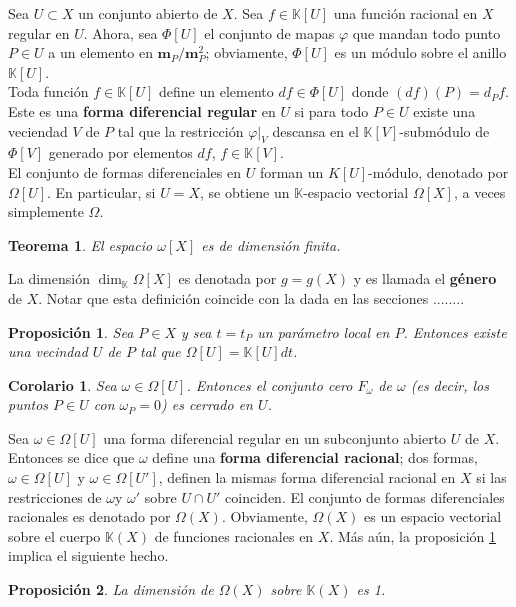 \documentclass[12pt,a4paper]{report}
\newcommand{\msp}{\mathbf{m}_{P}}
\newcommand{\K}{\mathbb{K}}
\newtheorem{teo}{Teorema}[chapter]
\newtheorem{cor}{Corolario}[chapter]
\newtheorem{prop}{Proposición}[chapter]
\begin{document}
Sea $U \subset X$ un conjunto abierto de $X$. Sea $f\in \K [U]$ una función racional en $X$ regular en $U$. Ahora, sea $\Phi [U]$  el conjunto de mapas $\varphi$ que mandan todo punto $P \in U$ a un elemento en $\msp/ \msp ^{2}$; obviamente, $\Phi[U]$ es un módulo sobre el anillo $\K[U]$. \\
Toda función $f \in \K[U]$ define un elemento $df \in \Phi[U]$ donde $(df)(P)=d_{P}f$. Este es una \textbf{forma diferencial regular} en $U$ si para todo $P \in U$ existe una veciendad $V$ de $P$ tal que la restricción $\varphi |_{V}$ descansa en el $\K[V]$-submódulo de $\Phi[V]$ generado por elementos $df$, $f \in \K[V]$.\\
El conjunto de formas diferenciales en $U$ forman un $K[U]$-módulo, denotado por $\Omega[U]$. En particular, si $U =X$, se obtiene un $\K$-espacio vectorial $\Omega[X]$, a veces simplemente $\Omega.$

\begin{teo}\label{2.2.2}
	El espacio $\omega[X]$ es de dimensión finita.
\end{teo}

La dimensión $\dim _{\K} \Omega[X] $ es denotada por $g=g(X)$ y es llamada el \textbf{género} de $X$. Notar que esta definición coincide con la dada en las secciones ........

\begin{prop}\label{2.2.3}
	Sea $P \in X$ y sea $t=t_{P}$ un parámetro local en $P$. Entonces existe una vecindad $U$ de $P$ tal que $\Omega[U] = \K[U]dt$.
\end{prop}

\begin{cor}
	Sea $\omega \in \Omega[U]$. Entonces el conjunto cero $F_{\omega}$ de $\omega$ (es decir, los puntos $P \in U$ con $\omega_{P}=0$) es cerrado en $U$.
\end{cor}

Sea $\omega \in \Omega[U]$ una forma diferencial regular en un subconjunto abierto $U$ de $X$. Entonces se dice que $\omega$ define una \textbf{forma diferencial racional}; dos formas, $\omega \in \Omega[U]$ y $\omega \in \Omega[U']$, definen la mismas forma diferencial racional en $X$ si las restricciones de $\omega$y $\omega'$ sobre $U \cap U'$ coinciden. El conjunto de formas diferenciales racionales es denotado por $\Omega(X)$. Obviamente, $\Omega(X)$ es un espacio vectorial sobre el cuerpo $\K(X)$ de funciones racionales en $X$. Más aún, la proposición \ref{2.2.3} implica el siguiente hecho.

\begin{prop}\label{2.2.5}
	La dimensión de $\Omega(X)$ sobre $\K(X)$ es 1.
\end{prop}
\end{document}
